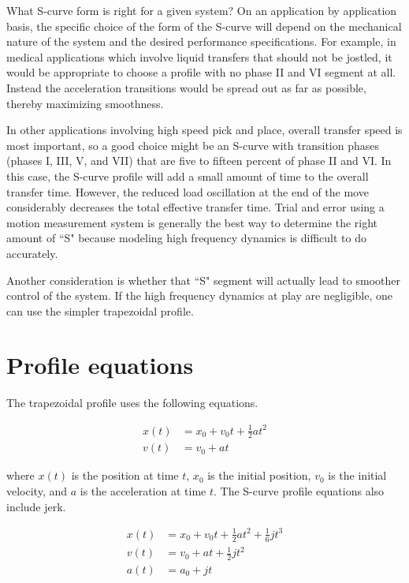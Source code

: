 What S-curve form is right for a given \gls{system}? On an application by
application basis, the specific choice of the form of the S-curve will depend on
the mechanical nature of the \gls{system} and the desired performance
specifications. For example, in medical applications which involve liquid
transfers that should not be jostled, it would be appropriate to choose a
profile with no phase II and VI segment at all. Instead the acceleration
transitions would be spread out as far as possible, thereby maximizing
smoothness.

In other applications involving high speed pick and place, overall transfer
speed is most important, so a good choice might be an S-curve with transition
phases (phases I, III, V, and VII) that are five to fifteen percent of phase II
and VI. In this case, the S-curve profile will add a small amount of time to the
overall transfer time. However, the reduced load oscillation at the end of the
move considerably decreases the total effective transfer time. Trial and error
using a motion measurement system is generally the best way to determine the
right amount of ``S" because modeling high frequency dynamics is difficult to
do accurately.

Another consideration is whether that ``S" segment will actually lead to
smoother control of the \gls{system}. If the high frequency dynamics at play are
negligible, one can use the simpler trapezoidal profile.

\section{Profile equations}

The trapezoidal profile uses the following equations.

\begin{align*}
  x(t) &= x_0 + v_0t + \frac{1}{2}at^2 \\
  v(t) &= v_0 + at
\end{align*}

where $x(t)$ is the position at time $t$, $x_0$ is the initial position, $v_0$
is the initial velocity, and $a$ is the acceleration at time $t$. The S-curve
profile equations also include jerk.

\begin{align*}
  x(t) &= x_0 + v_0t + \frac{1}{2}at^2 + \frac{1}{6}jt^3 \\
  v(t) &= v_0 + at + \frac{1}{2}jt^2 \\
  a(t) &= a_0 + jt
\end{align*}

